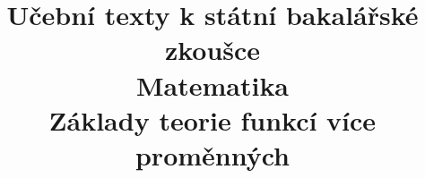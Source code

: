 \clearpage

\clearpage

\title{\LARGE Učební texty k státní bakalářské zkoušce \\ Matematika \\ Základy teorie funkcí více proměnných}



\maketitle

\newpage
\setcounter{section}{4}



